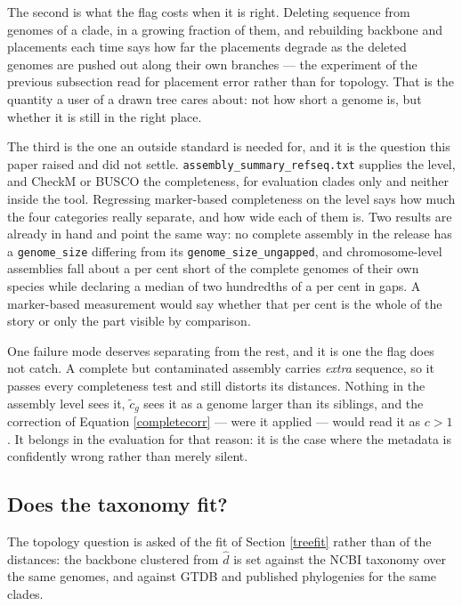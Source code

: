 \documentclass[pdflatex,sn-vancouver-num]{sn-jnl}
\begin{document}
The second is what the flag costs when it is right. Deleting sequence from genomes of a clade, in a
growing fraction of them, and rebuilding backbone and placements each time says how far the placements
degrade as the deleted genomes are pushed out along their own branches --- the experiment of the
previous subsection read for placement error rather than for topology. That is the quantity a user of
a drawn tree cares about: not how short a genome is, but whether it is still in the right place.

The third is the one an outside standard is needed for, and it is the question this paper raised and
did not settle. \texttt{assembly\_summary\_refseq.txt} supplies the level, and CheckM or BUSCO the
completeness, for evaluation clades only and neither inside the tool. Regressing marker-based
completeness on the level says how much the four categories really separate, and how wide each of
them is. Two results are already in hand and point the same way: no complete assembly in the release
has a \texttt{genome\_size} differing from its \texttt{genome\_size\_ungapped}, and chromosome-level
assemblies fall about a per cent short of the complete genomes of their own species while declaring a
median of two hundredths of a per cent in gaps. A marker-based measurement would say whether that per
cent is the whole of the story or only the part visible by comparison.

One failure mode deserves separating from the rest, and it is one the flag does not catch. A complete
but contaminated assembly carries \emph{extra} sequence, so it passes every completeness test and
still distorts its distances. Nothing in the assembly level sees it, $\tilde{c}_g$ sees it as a genome
larger than its siblings, and the correction of Equation \eqref{completecorr} --- were it applied
--- would read it as $c > 1$. It belongs in the evaluation for that reason: it is the case where the
metadata is confidently wrong rather than merely silent.

    \subsection{Does the taxonomy fit?}\label{taxfit}

The topology question is asked of the fit of Section \ref{treefit} rather than of the distances: the
backbone clustered from $\widehat{d}$ is set against the NCBI taxonomy over the same genomes, and
against GTDB \cite{parks2022gtdb} and published phylogenies for the same clades.
\end{document}
